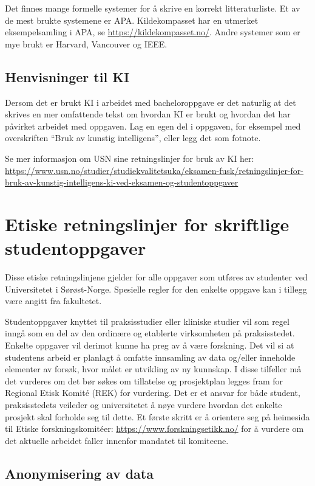 \documentclass{USN-BSc}
\begin{document}
Det finnes mange formelle systemer for å skrive en korrekt litteraturliste. Et
av de mest brukte systemene er APA. Kildekompasset har en utmerket
eksempelsamling i APA, se \url{https://kildekompasset.no/}. Andre systemer som
er mye brukt er Harvard, Vancouver og IEEE.

\subsection{Henvisninger til KI}

Dersom det er brukt KI i arbeidet med bacheloroppgave er det naturlig at det
skrives en mer omfattende tekst om hvordan KI er brukt og hvordan det har
påvirket arbeidet med oppgaven. Lag en egen del i oppgaven, for eksempel med
overskriften ``Bruk av kunstig intelligens'', eller legg det som fotnote.

Se mer informasjon om USN sine retningslinjer for bruk av KI her:
\url{https://www.usn.no/studier/studiekvalitetsuka/eksamen-fusk/retningslinjer-for-bruk-av-kunstig-intelligens-ki-ved-eksamen-og-studentoppgaver}

\section{Etiske retningslinjer for skriftlige studentoppgaver}

Disse etiske retningslinjene gjelder for alle oppgaver som utføres av studenter
ved Universitetet i Sørøst-Norge. Spesielle regler for den enkelte oppgave kan
i tillegg være angitt fra fakultetet.

Studentoppgaver knyttet til praksisstudier eller kliniske studier vil som regel
inngå som en del av den ordinære og etablerte virksomheten på praksisstedet.
Enkelte oppgaver vil derimot kunne ha preg av å være forskning. Det vil si at
studentens arbeid er planlagt å omfatte innsamling av data og/eller inneholde
elementer av forsøk, hvor målet er utvikling av ny kunnskap. I disse tilfeller
må det vurderes om det bør søkes om tillatelse og prosjektplan legges fram for
Regional Etisk Komité (REK) for vurdering. Det er et ansvar for både student,
praksisstedets veileder og universitetet å nøye vurdere hvordan det enkelte
prosjekt skal forholde seg til dette. Et første skritt er å orientere seg på
heimesida til Etiske forskningskomitéer:
\url{https://www.forskningsetikk.no/} for å vurdere om det aktuelle arbeidet
faller innenfor mandatet til komiteene.

\subsection{Anonymisering av data}
\end{document}
